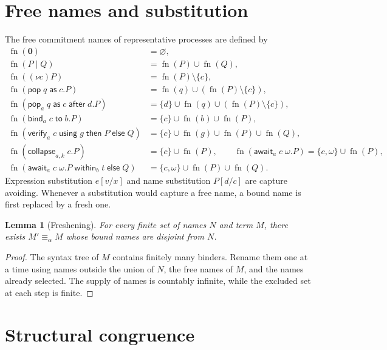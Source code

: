 \documentclass[11pt,openany]{book}
\newtheorem{lemma}[theorem]{Lemma}
\theoremstyle{remark}
\newcommand{\fn}{\operatorname{fn}}
\begin{document}
\section{Free names and substitution}

The free commitment names of representative processes are defined by
\[
\begin{aligned}
\fn(\mathbf 0)&=\varnothing,\\
\fn(P\mid Q)&=\fn(P)\cup\fn(Q),\\
\fn((\nu c)P)&=\fn(P)\setminus\{c\},\\
\fn(\mathsf{pop}\;q\;\mathsf{as}\;c.P)&=\fn(q)\cup
  (\fn(P)\setminus\{c\}),\\
\fn(\mathsf{pop}_a\;q\;\mathsf{as}\;c\;\mathsf{after}\;d.P)&=
  \{d\}\cup\fn(q)\cup(\fn(P)\setminus\{c\}),\\
\fn(\mathsf{bind}_a\;c\;\mathsf{to}\;b.P)&=
  \{c\}\cup\fn(b)\cup\fn(P),\\
\fn(\mathsf{verify}_a\;c\;\mathsf{using}\;g\;\mathsf{then}\;P\;
\mathsf{else}\;Q)&=\{c\}\cup\fn(g)\cup\fn(P)\cup\fn(Q),\\
\fn(\mathsf{collapse}_{a,k}\;c.P)&=\{c\}\cup\fn(P),\qquad
\fn(\mathsf{await}_a\;c\;\omega.P)=\{c,\omega\}\cup\fn(P),\\
\fn(\mathsf{await}_a\;c\;\omega.P\;\mathsf{within}_b\;t\;\mathsf{else}\;Q)
&=\{c,\omega\}\cup\fn(P)\cup\fn(Q).
\end{aligned}
\]
Expression substitution $e[v/x]$ and name substitution $P[d/c]$ are
capture avoiding. Whenever a substitution would capture a free name, a
bound name is first replaced by a fresh one.

\begin{lemma}[Freshening]
For every finite set of names $N$ and term $M$, there exists
$M'\equiv_\alpha M$ whose bound names are disjoint from $N$.
\end{lemma}

\begin{proof}
The syntax tree of $M$ contains finitely many binders. Rename them one at a
time using names outside the union of $N$, the free names of $M$, and the
names already selected. The supply of names is countably infinite, while
the excluded set at each step is finite.
\end{proof}

\section{Structural congruence}
\end{document}
